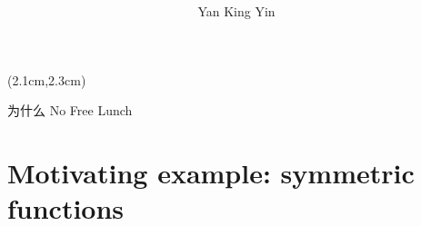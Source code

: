 \newcommand{\logic}[1]{{\color{violet}{\textit{#1}}}}
\newcommand{\underconst}{\texttt{[image: ../2020/UnderConst.png]}}
\newcommand{\KBsymbol}{\vcenter{\hbox{\texttt{[image: ../KB-symbol.png]}}}}
\newcommand{\token}{\vcenter{\hbox{\texttt{[image: token.png]}}}}
\newcommand{\proposition}{\vcenter{\hbox{\texttt{[image: proposition.png]}}}}



\begin{preview}

\title{\vspace{-1.5cm} \bfseries{}}

\author{Yan King Yin} %

\maketitle

\setcounter{section}{-1}
\setcounter{mypage}{0}

\begin{textblock*}{5cm}(2.1cm,2.3cm) %
{\color{red}{\large \textcircled{\small \themypage}}}
\addtocounter{mypage}{1}
\end{textblock*}

\begin{minipage}{\textwidth}
\setlength{\parskip}{0.4\baselineskip}

为什么 No Free Lunch 

\section{Motivating example: symmetric functions}


\end{minipage}
\end{preview}
